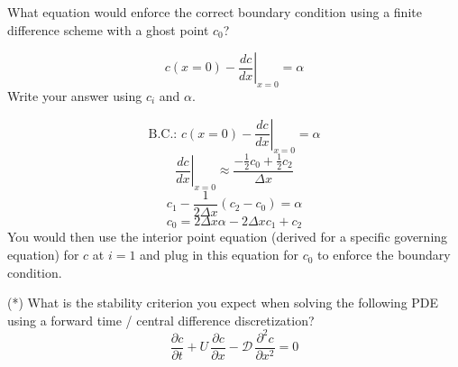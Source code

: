 \begin{exercise} %
    What equation would enforce the correct boundary condition using a finite difference scheme with a ghost point $c_0$?

    \[
        c(x=0)-\left.\frac{dc}{dx}\right|_{x=0} = \alpha
    \]
    Write your answer using $c_i$ and $\alpha$. 
\end{exercise}

\begin{solution}
    \[\text{B.C.: } c(x=0)-\left.\frac{dc}{dx}\right|_{x=0} = \alpha\]
    \[\left.\frac{dc}{dx}\right|_{x=0} \approx \frac{-\tfrac{1}{2} c_0 + \tfrac{1}{2} c_2}{\Delta x}\]
    \[c_1 - \frac{1}{2\Delta x} (c_2 - c_0) = \alpha\]
    \[\boxed{c_0 = 2\Delta x \alpha - 2 \Delta x c_1 + c_2}\]
    You would then use the interior point equation (derived for a specific governing equation) for \(c\) at \(i=1\) and plug in this equation for \(c_0\) to enforce the boundary condition.
\end{solution}

\begin{exercise} %
    (*) What is the stability criterion you expect when solving the following PDE using a forward time / central difference discretization?
    \[
        \frac{\partial c}{\partial t}
        + U\,\frac{\partial c}{\partial x}
        - \mathcal{D}\,\frac{\partial^2 c}{\partial x^2}
        = 0
    \]
\end{exercise}

